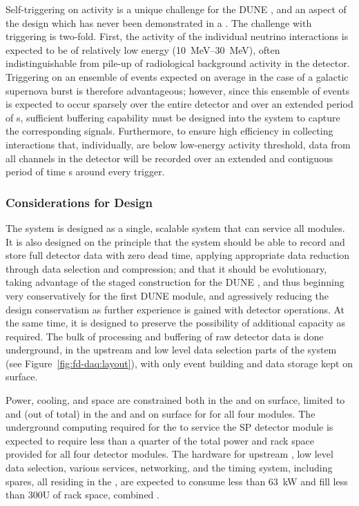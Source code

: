 Self-triggering on  activity is a unique challenge for the
DUNE , and an aspect of the design which has never been demonstrated
in a . The challenge with  triggering is two-fold. 
First, the activity of the individual  neutrino interactions
is expected to be of relatively low energy (\SIrange{10}{30}{\mega\electronvolt}),
often indistinguishable from pile-up of radiological background activity in the
detector.  Triggering on an ensemble of  events expected on
average in the case of a galactic supernova burst is therefore
advantageous; however, since this ensemble of events is expected to occur sparsely over the
entire detector and over an extended period of \si{s},
sufficient buffering capability must be designed into the system to
capture the corresponding signals. 
Furthermore, to ensure high efficiency in collecting  interactions
that, individually, are below low-energy activity threshold, data from
all channels in the detector will be recorded over an extended and contiguous period of
time \si{s} around every  trigger.

 

\subsubsection{Considerations for Design}
\label{sec:fd-daq:considerations}

The  system is designed as a single, scalable system that can
service all  modules. It is also designed on the principle that the
system should be able to record and store full detector data with zero dead
time, applying appropriate data reduction through data selection and
compression; and that it should be evolutionary, taking advantage of the
staged construction for the DUNE , and thus beginning very
conservatively for the first DUNE  module, and agressively reducing
the design conservatism as further experience is gained with detector
operations. At the same time, it is designed to preserve the possibility of
additional capacity as required. The bulk of processing and buffering of raw
detector data is done underground, in the upstream  and low
level data selection parts of the
system (see Figure~\ref{fig:fd-daq:layout}), with only event building and data
storage kept on surface.

Power, cooling, and space are constrained both in the  and on surface, limited to \daqpower and \daqracks (out of \cucracks total) in the  and \surfdaqpower and \surfdaqracks on surface for  for all four  modules.
The underground computing required for the  to service the SP detector module is expected to require less than a quarter of the total power and rack space provided for all four detector modules. 
The hardware for upstream , low level data selection,
various services, networking, and the timing system, including spares,
all residing in the , 
are expected to consume less than \SI{63}{\kilo\watt} and fill less
than 300U of rack space, combined \cite{ale}.

